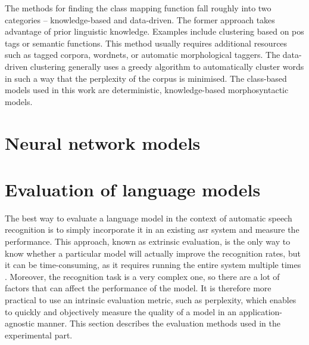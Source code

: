 	The methods for finding the class mapping function fall roughly into two categories -- knowledge-based and data-driven. The former approach takes advantage of prior linguistic knowledge. Examples include clustering based on \gls{pos} tags or semantic functions. This method usually requires additional resources such as tagged corpora, wordnets, or automatic morphological taggers. The data-driven clustering generally uses a greedy algorithm to automatically cluster words in such a way that the perplexity of the corpus is minimised. The class-based models used in this work are deterministic, knowledge-based morphosyntactic models.
	\section{Neural network models}
	\label{section:ann}
	\section{Evaluation of language models}
	\label{section:evaluation}
	The best way to evaluate a language model in the context of automatic speech recognition is to simply incorporate it in an existing \gls{asr} system and measure the performance. This approach, known as extrinsic evaluation, is the only way to know whether a particular model will actually improve the recognition rates, but it can be time-consuming, as it requires running the entire system multiple times \cite{jurafsky2000speech}. Moreover, the recognition task is a very complex one, so there are a lot of factors that can affect the performance of the model. It is therefore more practical to use an intrinsic evaluation metric, such as perplexity, which enables to quickly and objectively measure the quality of a model in an application-agnostic manner. This section describes the evaluation methods used in the experimental part.
